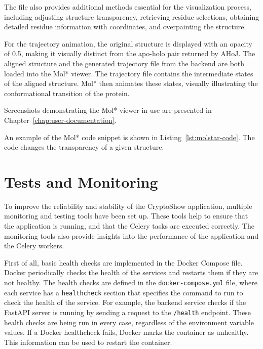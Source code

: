 The file also provides additional methods essential for the visualization process, including adjusting structure transparency, retrieving residue selections, obtaining detailed residue information with coordinates, and overpainting the structure.

For the trajectory animation, the original structure is displayed with an opacity of 0.5, making it visually distinct from the apo-holo pair returned by AHoJ. The aligned structure and the generated trajectory file from the backend are both loaded into the Mol* viewer. The trajectory file contains the intermediate states of the aligned structure. Mol* then animates these states, visually illustrating the conformational transition of the protein.

Screenshots demonstrating the Mol* viewer in use are presented in Chapter~\ref{chap:user-documentation}.

An example of the Mol* code snippet is shown in Listing~\ref{lst:molstar-code}. The code changes the transparency of a given structure.



\section{Tests and Monitoring}
\label{sec:tests-monitoring}

To improve the reliability and stability of the CryptoShow application, multiple monitoring and testing tools have been set up. These tools help to ensure that the application is running, and that the Celery tasks are executed correctly. The monitoring tools also provide insights into the performance of the application and the Celery workers.

First of all, basic health checks are implemented in the Docker Compose file. Docker periodically checks the health of the services and restarts them if they are not healthy. The health checks are defined in the \lstinline|docker-compose.yml| file, where each service has a \lstinline|healthcheck| section that specifies the command to run to check the health of the service. For example, the backend service checks if the FastAPI server is running by sending a request to the \lstinline|/health| endpoint. These health checks are being run in every case, regardless of the environment variable values. If a Docker healthcheck fails, Docker marks the container as unhealthy. This information can be used to restart the container.

